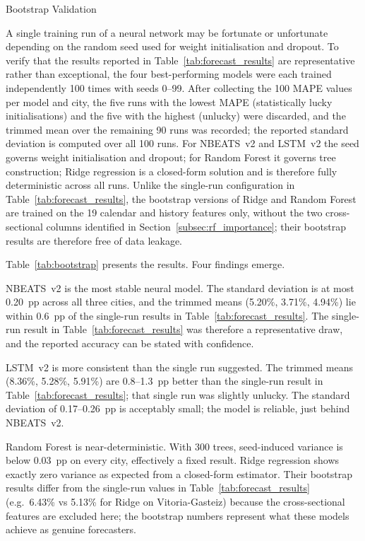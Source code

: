 ﻿\documentclass[12pt,reqno, twoside]{amsbook}
\makeatletter
\numberwithin{figure}{chapter}
\numberwithin{table}{chapter}
\numberwithin{equation}{chapter}
\def\subsection{\@startsection{subsection}{2}%
      \z@{.5\linespacing\@plus.7\linespacing}{.25\linespacing}%
      {\normalfont\bfseries\flushleft}}
\theoremstyle{plain}
\numberwithin{equation}{chapter}
\numberwithin{section}{chapter}
\makeatother
\begin{document}
\FloatBarrier

\subsection{Bootstrap Validation}
\label{subsec:bootstrap}

A single training run of a neural network may be fortunate or unfortunate depending on the random seed used for weight initialisation and dropout. To verify that the results reported in Table~\ref{tab:forecast_results} are representative rather than exceptional, the four best-performing models were each trained independently 100 times with seeds 0--99. After collecting the 100 \ac{MAPE} values per model and city, the five runs with the lowest \ac{MAPE} (statistically lucky initialisations) and the five with the highest (unlucky) were discarded, and the trimmed mean over the remaining 90 runs was recorded; the reported standard deviation is computed over all 100 runs. For \ac{NBEATS}~v2 and \ac{LSTM}~v2 the seed governs weight initialisation and dropout; for Random Forest it governs tree construction; Ridge regression is a closed-form solution and is therefore fully deterministic across all runs. Unlike the single-run configuration in Table~\ref{tab:forecast_results}, the bootstrap versions of Ridge and Random Forest are trained on the 19 calendar and history features only, without the two cross-sectional columns identified in Section~\ref{subsec:rf_importance}; their bootstrap results are therefore free of data leakage.

Table~\ref{tab:bootstrap} presents the results. Four findings emerge.

\ac{NBEATS}~v2 is the most stable neural model. The standard deviation is at most 0.20~\ac{pp} across all three cities, and the trimmed means (5.20\%, 3.71\%, 4.94\%) lie within 0.6~\ac{pp} of the single-run results in Table~\ref{tab:forecast_results}. The single-run result in Table~\ref{tab:forecast_results} was therefore a representative draw, and the reported accuracy can be stated with confidence.

\ac{LSTM}~v2 is more consistent than the single run suggested. The trimmed means (8.36\%, 5.28\%, 5.91\%) are 0.8--1.3~\ac{pp} better than the single-run result in Table~\ref{tab:forecast_results}; that single run was slightly unlucky. The standard deviation of 0.17--0.26~\ac{pp} is acceptably small; the model is reliable, just behind \ac{NBEATS}~v2.

Random Forest is near-deterministic. With 300 trees, seed-induced variance is below 0.03~\ac{pp} on every city, effectively a fixed result. Ridge regression shows exactly zero variance as expected from a closed-form estimator. Their bootstrap results differ from the single-run values in Table~\ref{tab:forecast_results} (e.g.\ 6.43\% vs 5.13\% for Ridge on Vitoria-Gasteiz) because the cross-sectional features are excluded here; the bootstrap numbers represent what these models achieve as genuine forecasters.
\end{document}
